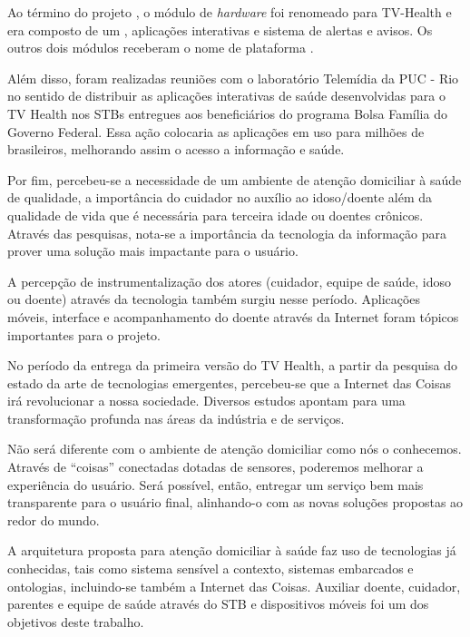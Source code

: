 Ao término do projeto \nextsaude[], o módulo de \textit{hardware} foi renomeado para
TV-Health e era composto de um \stb[], aplicações interativas e sistema de alertas 
e avisos. Os outros dois módulos receberam o nome de plataforma \nextsaude.

Além disso, foram realizadas reuniões com o laboratório Telemídia da PUC - Rio
no sentido de distribuir as aplicações interativas de saúde desenvolvidas para o TV
Health nos STBs entregues aos beneficiários do programa Bolsa Família do Governo Federal.
Essa ação colocaria as aplicações em uso para milhões de brasileiros,
melhorando assim o acesso a informação e saúde.



Por fim, percebeu-se a necessidade de um ambiente de atenção domiciliar à saúde
de qualidade, a importância do cuidador no auxílio ao idoso/doente além da
qualidade de vida que é necessária para terceira idade ou doentes crônicos.
Através das pesquisas, nota-se a importância da tecnologia da
informação para prover uma solução mais impactante para o usuário. 

A percepção de instrumentalização dos atores (cuidador, equipe de saúde, idoso
ou doente) através da tecnologia também surgiu nesse período. Aplicações
móveis, interface \web[] e acompanhamento do doente através da Internet foram
tópicos importantes para o projeto.

No período da entrega da primeira versão do TV Health, a partir da
pesquisa do estado da arte de tecnologias emergentes, percebeu-se que a Internet das Coisas
irá revolucionar a nossa sociedade. Diversos estudos apontam para uma transformação
profunda nas áreas da indústria e de serviços.

Não será diferente com o ambiente de atenção domiciliar como nós o conhecemos. Através
de ``coisas'' conectadas dotadas de sensores, poderemos melhorar a experiência
do usuário. Será possível, então, entregar um serviço bem mais transparente
para o usuário final, alinhando-o com as novas soluções propostas ao
redor do mundo.

A arquitetura proposta para atenção domiciliar à saúde faz uso de tecnologias
já conhecidas, tais como sistema sensível a contexto, sistemas embarcados e
ontologias, incluindo-se também a Internet das Coisas. Auxiliar doente, cuidador,
parentes e equipe de saúde através do STB e dispositivos móveis foi um dos
objetivos deste trabalho. 

